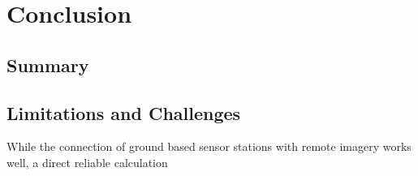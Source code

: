 \documentclass[12pt,a4paper, english]{article}
\begin{document}
%
%
\section{Conclusion}\label{sec:conclusion}
\subsection{Summary}

\subsection{Limitations and Challenges}
While the connection of ground based sensor stations with remote imagery works well, a direct reliable calculation 
% 
\end{document}
